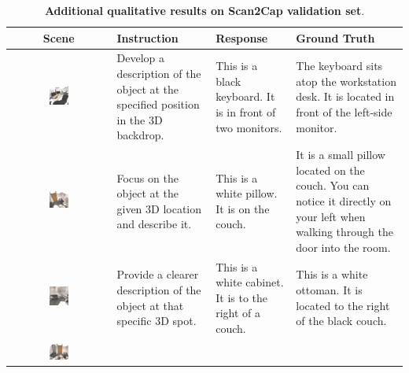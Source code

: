 \begin{table}[t]
    \centering
    \caption{\textbf{Additional qualitative results on Scan2Cap validation set}.}
    \small
    \begin{tabular}{c|p{8em}|p{8em}|p{10em}}
    \toprule
         Scene  & Instruction & Response & Ground Truth  \\
         \midrule
            \raisebox{-1\height}
            {\includegraphics[width=0.2\textwidth]{figs/scan2cap_keyboard.jpg}} & 
            Develop a description of the object at the specified position in the 3D backdrop. & This is a black keyboard. It is in front of two monitors. &
            The keyboard sits atop the workstation desk. It is located in front of the left-side monitor.\\
         \midrule
            \raisebox{-1\height}
            {\includegraphics[width=0.2\textwidth, ]{figs/scan2cap_pillow.jpg}} &
            Focus on the object at the given 3D location and describe it. & This is a white pillow. It is on the couch. & It is a small pillow located on the couch.  You can notice it directly on your left when walking through the door into the room. \\
         \midrule
         \raisebox{-1\height}
         {\includegraphics[width=0.2\textwidth, ]{figs/scan2cap_cabinet.jpg}} & Provide a clearer description of the object at that specific 3D spot. &  This is a white cabinet. It is to the right of a couch. &
         This is a white ottoman. It is located to the right of the black couch. \\
        \midrule
            \raisebox{-1\height}
            {\includegraphics[width=0.2\textwidth]{figs/scan2cap_door.jpg}} &

\end{tabular}
\end{table}
